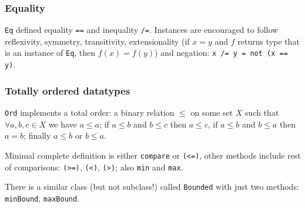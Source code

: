 %

\subsubsection{Equality}
\texttt{Eq} defined equality \texttt{==} and inequality \texttt{/=}.
Instances are encouraged to follow reflexivity, symmetry, transitivity, extensionality (if $x = y$ and $f$ returns type that is an instance of \texttt{Eq}, then $f(x) = f(y)$) and negation: \texttt{x /= y = not (x == y)}.

\subsubsection{Totally ordered datatypes}
\texttt{Ord} implements a total order: a binary relation $\le$ on some set $X$ such that $\forall a, b, c \in X$ we have $a \le a$; if $a \le b$ and $b \le c$ then $a \le c$, if $a \le b$ and $b \le a$ then $a = b$; finally $a \le b$ or $b \le a$.

Minimal complete definition is either \texttt{compare} or \texttt{(<=)}, other methods include rest of comparisons: \texttt{(>=)}, \texttt{(<)}, \texttt{(>)}; also \texttt{min} and \texttt{max}.

There is a similar class (but not subclass!) called \texttt{Bounded} with just two methods: \texttt{minBound}, \texttt{maxBound}.

%